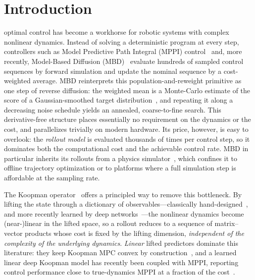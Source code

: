 \documentclass[lettersize,journal]{IEEEtran}
\theoremstyle{remark}
\begin{document}
\section{Introduction}\label{sec:intro}
 optimal control has become a workhorse for
robotic systems with complex nonlinear dynamics. Instead of solving a
deterministic program at every step, controllers such as Model Predictive
Path Integral (MPPI) control~\cite{kappen2005, theodorou2010,
williams2017mppi, williams2016aggressive} and, more recently, Model-Based
Diffusion (MBD)~\cite{pan2024model, xue2025full} evaluate hundreds of
sampled control sequences by forward simulation and update the nominal
sequence by a cost-weighted average.
MBD reinterprets this population-and-reweight primitive as one step of
reverse diffusion: the weighted mean is a Monte-Carlo estimate of the
score of a Gaussian-smoothed target
distribution~\cite{song2019generative, song2020score}, and repeating it
along a decreasing noise schedule yields an annealed, coarse-to-fine
search. This
derivative-free structure places essentially no requirement on the
dynamics or the cost, and parallelizes trivially on modern hardware. Its
price, however, is easy to overlook: the \emph{rollout model} is evaluated
thousands of times per control step, so it dominates both the
computational cost and the achievable control rate. MBD in particular
inherits its rollouts from a physics simulator~\cite{pan2024model}, which
confines it to offline trajectory optimization or to platforms where a
full simulation step is affordable at the sampling rate.

The Koopman operator~\cite{koopman1931, mezic2005} offers a principled way
to remove this bottleneck. By lifting the state through a dictionary of
observables---classically hand-designed~\cite{williams2015edmd,
proctor2016dmdc}, and more recently learned by deep
networks~\cite{lusch2018deep}---the nonlinear dynamics become (near-)linear
in the lifted space, so a rollout reduces to a sequence of matrix--vector
products whose cost is fixed by the lifting dimension, \emph{independent of
the complexity of the underlying dynamics}. \emph{Linear} lifted predictors
dominate this literature: they keep Koopman MPC convex by
construction~\cite{korda2018mpc, strasser2026}, and a learned linear deep
Koopman model has recently been coupled with MPPI, reporting control
performance close to true-dynamics MPPI at a fraction of the
cost~\cite{mppidk2026}.
\end{document}
